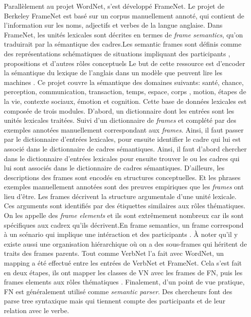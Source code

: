 Parallèlement au projet WordNet, s'est développé FrameNet. Le projet de Berkeley FrameNet est basé sur un corpus manuellement annoté, qui contient de l'information sur les noms, adjectifs et verbes de la langue anglaise. Dans FrameNet, les unités lexicales sont décrites en termes de \emph{frame semantics}, qu'on traduirait par la sémantique des cadres.Les semantic frames sont définis comme des représentations schématiques de situations impliquant des participants , propositions et d'autres rôles conceptuels Le but de cette ressource est d'encoder la sémantique du lexique de l'anglais dans un modèle que peuvent lire les machines \citep{BakerBerkeleyFrameNetProject1998}. Ce projet couvre la sémantique des domaines suivants: santé, chance, perception, communication, transaction, temps, espace, corps , motion, étapes de la vie, contexte sociaux, émotion et cognition. Cette base de données lexicales est composée de trois modules. D'abord, un dictionnaire dont les entrées sont les unités lexicales traitées. Suivi d'un dictionnaire de \emph{frames} et complété par des exemples annotées manuellement correspondant aux \emph{frames}. Ainsi, il faut passer par le dictionnaire d'entrées lexicales, pour ensuite identifier le cadre qui lui est associé dans le dictionnaire de cadres sémantiques. Ainsi, il faut d'abord chercher dans le dictionnaire d'entrées lexicales pour ensuite trouver le ou les cadres qui lui sont associés dans le dictionnaire de cadres sémantiques. D'ailleurs, les descriptions des frames sont encodés en structures conceptuelles. Et les phrases exemples manuellement annotées sont des preuves empiriques que les \emph{frames} ont lieu d'être. Les frames décrivent la structure argumentale d'une unité lexicale. Ces arguments sont identifiés par des étiquettes similaires aux rôles thématiques. On les appelle des \emph{frame elements} et ils sont extrêmement nombreux car ils sont spécifiques aux cadrex qu'ils décrivent.En frame semantics, un frame correspond à un scénario qui implique une intéraction et des participants \citep{Shi:2005:PPT:2132047.2132058}. À noter qu'il y existe aussi une organisation hiérarchique où on a des sous-frames qui héritent de traits des frames parents. Tout comme VerbNet l'a fait avec WordNet, un mapping a été effectué entre les entrées de VerbNet et FrameNet. Cela s'est fait en deux étapes, ils ont mapper les classes de VN avec les frames de FN, puis les frames elements aux rôles thématiques \citep{Shi:2005:PPT:2132047.2132058}. Finalement, d'un point de vue pratique, FN est généralement utilisé comme \emph{semantic parser}. Des chercheurs font des parse tree syntaxique mais qui tiennent compte des participants et de leur relation avec le verbe\citep{Shi:2005:PPT:2132047.2132058}.

